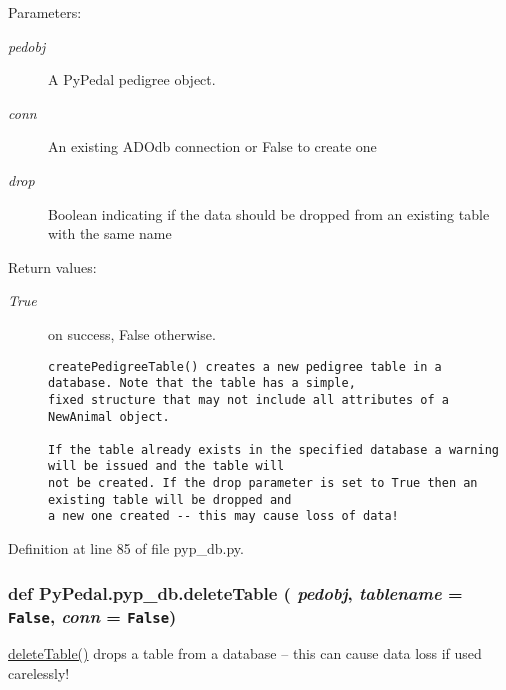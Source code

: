 \begin{Desc}
\item[Parameters:]
\begin{description}
\item[{\em pedobj}]A Py\-Pedal pedigree object. \item[{\em conn}]An existing ADOdb connection or False to create one \item[{\em drop}]Boolean indicating if the data should be dropped from an existing table with the same name \end{description}
\end{Desc}
\begin{Desc}
\item[Return values:]
\begin{description}
\item[{\em True}]on success, False otherwise.

\footnotesize\begin{verbatim}createPedigreeTable() creates a new pedigree table in a database. Note that the table has a simple,
fixed structure that may not include all attributes of a NewAnimal object.

If the table already exists in the specified database a warning will be issued and the table will
not be created. If the drop parameter is set to True then an existing table will be dropped and
a new one created -- this may cause loss of data!
\end{verbatim}
\normalsize
 \end{description}
\end{Desc}


Definition at line 85 of file pyp\_\-db.py.\hypertarget{namespacePyPedal_1_1pyp__db_5c8b6cc2ea0230b94b0f42f3dfb8556b}{
\subsubsection[deleteTable]{\setlength{\rightskip}{0pt plus 5cm}def Py\-Pedal.pyp\_\-db.delete\-Table ( {\em pedobj},  {\em tablename} = {\tt False},  {\em conn} = {\tt False})}}
\label{namespacePyPedal_1_1pyp__db_5c8b6cc2ea0230b94b0f42f3dfb8556b}


\hyperlink{namespacePyPedal_1_1pyp__db_5c8b6cc2ea0230b94b0f42f3dfb8556b}{delete\-Table()} drops a table from a database -- this can cause data loss if used carelessly! 

